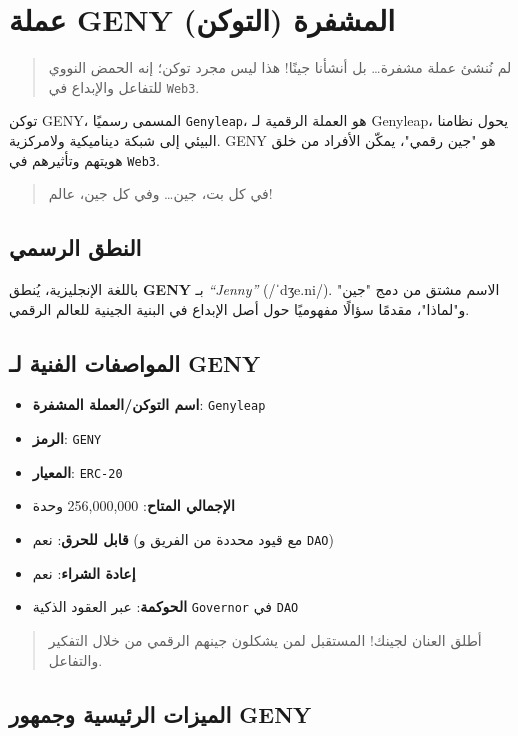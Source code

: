 \documentclass[a4paper,12pt,openany]{book}
\begin{document}
\chapter{عملة GENY المشفرة (التوكن)}
\begin{quote}
لم نُنشئ عملة مشفرة… بل أنشأنا جينًا! هذا ليس مجرد توكن؛ إنه الحمض النووي للتفاعل والإبداع في \texttt{Web3}.
\end{quote}
توكن GENY، المسمى رسميًا \texttt{Genyleap}، هو العملة الرقمية لـ Genyleap، يحول نظامنا البيئي إلى شبكة ديناميكية ولامركزية. GENY هو "جين رقمي"، يمكّن الأفراد من خلق هويتهم وتأثيرهم في \texttt{Web3}.
\begin{quote}
في كل بت، جين… وفي كل جين، عالم!
\end{quote}

\section*{النطق الرسمي}
باللغة الإنجليزية، يُنطق \textbf{GENY} بـ \textit{``Jenny''} ({\ipafont /ˈdʒe.ni/}). الاسم مشتق من دمج "جين" و"لماذا"، مقدمًا سؤالًا مفهوميًا حول أصل الإبداع في البنية الجينية للعالم الرقمي.

\section*{المواصفات الفنية لـ GENY}
\begin{itemize}
    \item \textbf{اسم التوكن/العملة المشفرة}: \texttt{Genyleap}
    \item \textbf{الرمز}: \texttt{GENY}
    \item \textbf{المعيار}: \texttt{ERC-20}
    \item \textbf{الإجمالي المتاح}: 256,000,000 وحدة
    \item \textbf{قابل للحرق}: نعم (مع قيود محددة من الفريق و \texttt{DAO})
    \item \textbf{إعادة الشراء}: نعم
    \item \textbf{الحوكمة}: عبر العقود الذكية \texttt{Governor} في \texttt{DAO}
\end{itemize}
\vspace{-0.5em}
\begin{quote}
أطلق العنان لجينك! المستقبل لمن يشكلون جينهم الرقمي من خلال التفكير والتفاعل.
\end{quote}
\newpage

\section*{الميزات الرئيسية وجمهور GENY}
\end{document}

